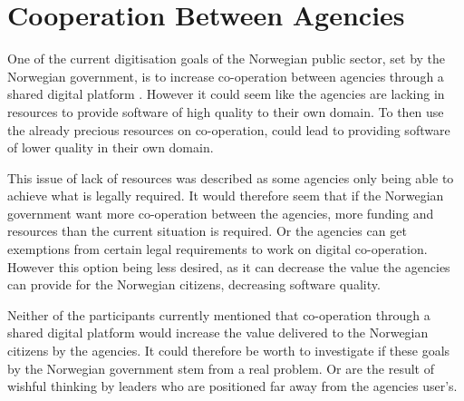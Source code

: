 

\section{Cooperation Between Agencies}
One of the current digitisation goals of the Norwegian public sector, set by the Norwegian government, is to increase co-operation between agencies through a shared digital platform \cite{r_2019}. However it could seem like the agencies are lacking in resources to provide software of high quality to their own domain. To then use the already precious resources on co-operation, could lead to providing software of lower quality in their own domain. 

This issue of lack of resources was described as some agencies only being able to achieve what is legally required. It would therefore seem that if the Norwegian government want more co-operation between the agencies, more funding and resources than the current situation is required. Or the agencies can get exemptions from certain legal requirements to work on digital co-operation. However this option being less desired, as it can decrease the value the agencies can provide for the Norwegian citizens, decreasing software quality.

Neither of the participants currently mentioned that co-operation through a shared digital platform would increase the value delivered to the Norwegian citizens by the agencies. It could therefore be worth to investigate if these goals by the Norwegian government stem from a real problem. Or are the result of wishful thinking by leaders who are positioned far away from the agencies user's. 

